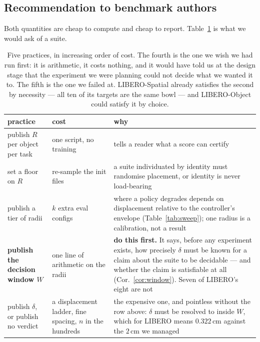 \documentclass[10pt,twocolumn]{article}
\begin{document}
\subsection{Recommendation to benchmark authors}

Both quantities are cheap to compute and cheap to report.
Table~\ref{tab:recs} is what we would ask of a suite.

\begin{table}[h]\centering\footnotesize
\setlength{\tabcolsep}{3.5pt}
\begin{tabular}{p{1.6cm}p{2.35cm}p{3.2cm}}
\toprule
practice & cost & why \\
\midrule
publish $R$ per object per task & one script, no training & tells a reader what a score can certify \\
\addlinespace
set a floor on $R$ & re-sample the init files & a suite individuated by identity must randomise placement, or identity is never load-bearing \\
\addlinespace
publish a tier of radii & $k$ extra eval configs & where a policy degrades depends on displacement relative to the controller's envelope (Table~\ref{tab:sweep}); one radius is a calibration, not a result \\
\addlinespace
\textbf{publish the decision window $W$} & one line of arithmetic on the radii & \textbf{do this first.} It says, before any experiment exists, how precisely $\delta$ must be known for a claim about the suite to be decidable --- and whether the claim is satisfiable at all (Cor.~\ref{cor:window}). Seven of LIBERO's eight are not \\
\addlinespace
publish $\delta$, or publish no verdict & a displacement ladder, fine spacing, $n$ in the hundreds & the expensive one, and pointless without the row above: $\delta$ must be resolved to inside $W$, which for LIBERO means $0.322$\,cm against the $2$\,cm we managed \\
\bottomrule
\end{tabular}
\caption{Five practices, in increasing order of cost. The fourth is the one we
wish we had run first: it is arithmetic, it costs nothing, and it would have
told us at the design stage that the experiment we were planning could not
decide what we wanted it to. The fifth is the one we failed at. LIBERO-Spatial already
satisfies the second by necessity --- all ten of its targets are the same bowl
--- and LIBERO-Object could satisfy it by choice.}
\label{tab:recs}
\end{table}
\end{document}
